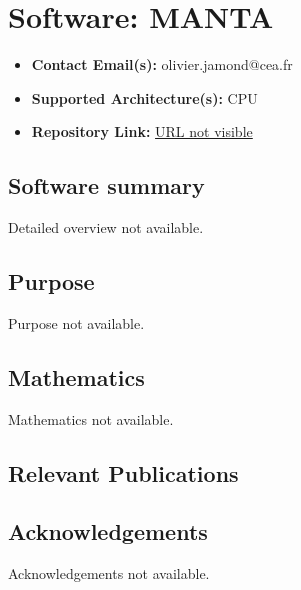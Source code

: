 \section{Software: MANTA}
\label{sec:MANTA:software}



\begin{itemize}
    \item \textbf{Contact Email(s):} olivier.jamond@cea.fr
    \item \textbf{Supported Architecture(s):} CPU
    \item \textbf{Repository Link:} \href{URL not visible}{URL not visible}
\end{itemize}

\subsection{Software summary}
\label{sec:MANTA:summary}
Detailed overview not available.



\subsection{Purpose}
\label{sec:MANTA:purpose}
Purpose not available.



\subsection{Mathematics}
\label{sec:MANTA:mathematics}
Mathematics not available.


\subsection{Relevant Publications}
\label{sec:MANTA:publications}

\subsection{Acknowledgements}
\label{sec::MANTA:acknowledgements}

Acknowledgements not available.


